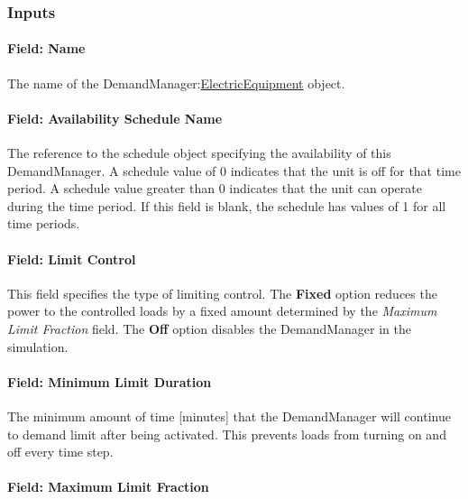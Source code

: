 \subsubsection{Inputs}\label{inputs-3-008}

\paragraph{Field: Name}\label{field-name-3-008}

The name of the DemandManager:\hyperref[electricequipment]{ElectricEquipment} object.

\paragraph{Field: Availability Schedule Name}\label{field-availability-schedule-name-2-000}

The reference to the schedule object specifying the availability of this DemandManager. A schedule value of 0 indicates that the unit is off for that time period. A schedule value greater than 0 indicates that the unit can operate during the time period. If this field is blank, the schedule has values of 1 for all time periods.

\paragraph{Field: Limit Control}\label{field-limit-control-2}

This field specifies the type of limiting control. The \textbf{Fixed} option reduces the power to the controlled loads by a fixed amount determined by the \emph{Maximum Limit Fraction} field. The \textbf{Off} option disables the DemandManager in the simulation.

\paragraph{Field: Minimum Limit Duration}\label{field-minimum-limit-duration-2}

The minimum amount of time {[}minutes{]} that the DemandManager will continue to demand limit after being activated. This prevents loads from turning on and off every time step.

\paragraph{Field: Maximum Limit Fraction}\label{field-maximum-limit-fraction-2}

